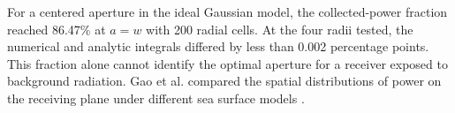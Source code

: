 For a centered aperture in the ideal Gaussian model, the collected-power
fraction reached 86.47\% at $a=w$ with 200 radial cells.
At the four radii tested, the numerical and analytic integrals differed
by less than 0.002 percentage points. This fraction alone cannot identify
the optimal aperture for a receiver exposed to background radiation.
Gao et al. compared the spatial distributions of power on the receiving
plane under different sea surface models \cite{Gao2025}.
